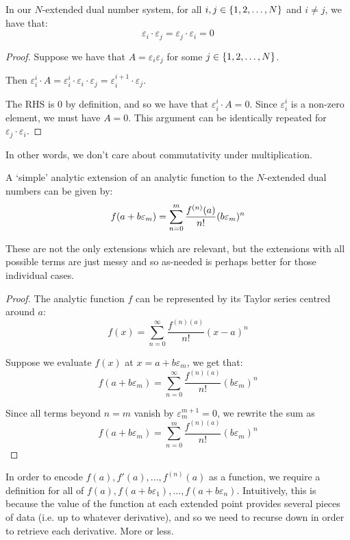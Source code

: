 \begin{theorem}
    In our $N$-extended dual number system, for all $i,j\in\{1,2,\dots,N\}$ and $i\neq j$, we have that:
    $$
        \varepsilon_i\cdot\varepsilon_j=\varepsilon_j\cdot\varepsilon_i=0
    $$

    \begin{proof}
        Suppose we have that $A=\varepsilon_i\varepsilon_j$ for some $j\in\{1,2,\dots,N\}$.

        Then $\varepsilon_i^i\cdot A=\varepsilon_i^i\cdot\varepsilon_i\cdot\varepsilon_j=\varepsilon_i^{i+1}\cdot\varepsilon_j$.

        The RHS is $0$ by definition, and so we have that $\varepsilon_i^i\cdot A=0$. Since $\varepsilon_i^i$ is a non-zero element, we must have $A=0$. This argument can be identically repeated for $\varepsilon_j\cdot\varepsilon_i$.
    \end{proof}

    In other words, we don't care about commutativity under multiplication.
\end{theorem}

\begin{theorem}
    A `simple' analytic extension of an analytic function to the $N$-extended dual numbers can be given by:
    $$
        f(a+b\varepsilon_m)=\sum_{n=0}^{m}{\frac{f^{(n)}(a)}{n!}(b\varepsilon_m)^n}
    $$

    These are not the only extensions which are relevant, but the extensions with all possible terms are just messy and so as-needed is perhaps better for those individual cases.
    \begin{proof}
        The analytic function $f$ can be represented by its Taylor series centred around $a$:
        $$
            f(x) = \sum_{n=0}^{\infty}{\frac{f^{(n)(a)}}{n!}(x-a)^n}
        $$

        Suppose we evaluate $f(x)$ at $x=a+b\varepsilon_m$, we get that:
        $$
            f(a+b\varepsilon_m) = \sum_{n=0}^{\infty}{\frac{f^{(n)(a)}}{n!}(b\varepsilon_m)^n}
        $$

        Since all terms beyond $n=m$ vanish by $\varepsilon_m^{m+1}=0$, we rewrite the sum as
        $$
            f(a+b\varepsilon_m) = \sum_{n=0}^{m}{\frac{f^{(n)(a)}}{n!}(b\varepsilon_m)^n}
        $$
    \end{proof}
\end{theorem}

In order to encode $f(a),f'(a),\dots,f^{(n)}(a)$ as a function, we require a definition for all of $f(a),f(a+b\varepsilon_1),\dots,f(a+b\varepsilon_n)$. Intuitively, this is because the value of the function at each extended point provides several pieces of data (i.e. up to whatever derivative), and so we need to recurse down in order to retrieve each derivative. More or less.

